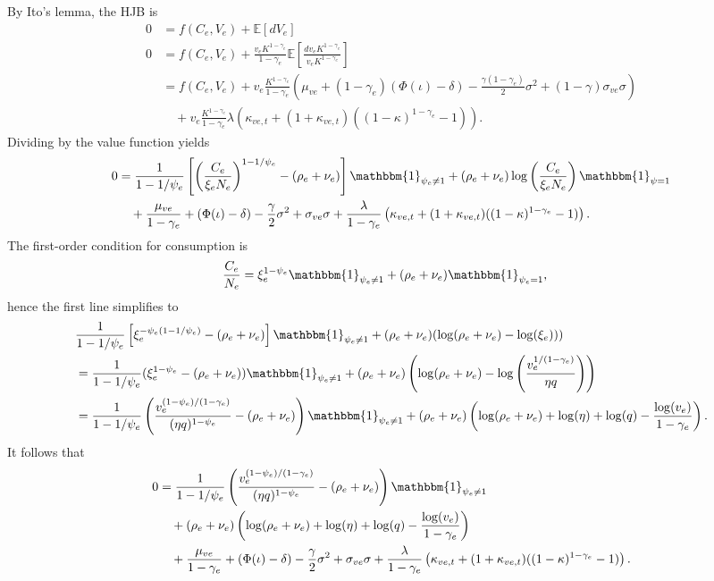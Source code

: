 \documentclass[12 pt, oneside]{article}
\theoremstyle{definition}
\theoremstyle{definition}
\theoremstyle{definition}
\newcommand{\E}{\mathbb{E}}
\begin{document}
By Ito's lemma, the HJB is
\begin{align*}
  0 & = f(C_e, V_e) + \E[dV_e] \\
  0 & = f(C_e, V_e) + \frac{v_eK^{1 - \gamma_e}}{1 - \gamma_e}\E\left[\frac{dv_eK^{1 - \gamma_e}}{v_eK^{1 - \gamma_e}}\right] \\
    & = f(C_e, V_e) + v_e\frac{K^{1 - \gamma_e}}{1 - \gamma_e}\left(\mu_{ve} + (1 - \gamma_e)(\Phi(\iota) - \delta) - \frac{\gamma(1 - \gamma_e)}{2}\sigma^2 + (1 - \gamma)\sigma_{ve} \sigma\right)\\
    &\quad +   v_e\frac{K^{1 - \gamma_e}}{1 - \gamma_e} \lambda\left(\kappa_{ve, t} + (1 + \kappa_{ve, t})((1 - \kappa)^{1 - \gamma_e} - 1) \right).
\end{align*}
Dividing by the value function yields
\begin{align*}
  0 & = \frac{1}{1 - 1 / \psi_e}\left[\left( \frac{C_e}{\xi_eN_e}\right)^{1 - 1 / \psi_e} - (\rho_e +\nu_e)\right]\mathbbm{1}_{\psi_e \neq 1} + (\rho_e + \nu_e)\log\left(\frac{C_e}{\xi_eN_e}\right)\mathbbm{1}_{\psi = 1}\\
&\quad + \frac{\mu_{ve}}{1 - \gamma_e} + (\Phi(\iota)  - \delta) - \frac{\gamma}{2}\sigma^2 + \sigma_{ve}\sigma +   \frac{\lambda}{1 - \gamma_e}\left(\kappa_{ve, t} + (1 + \kappa_{ve, t})((1 - \kappa)^{1 - \gamma_e} - 1) \right).
\end{align*}
The first-order condition for consumption is
\begin{align*}
  \frac{C_e}{N_e} & = \xi_e^{1 - \psi_e}\mathbbm{1}_{\psi_e \neq 1 } + (\rho_e + \nu_e)\mathbbm{1}_{\psi_e = 1},
\end{align*}
hence the first line simplifies to
\begin{align*}
&  \frac{1}{1 - 1/\psi_e}\left[\xi_e^{-\psi_e(1 - 1 / \psi_e)} -(\rho_e + \nu_e)   \right]\mathbbm{1}_{\psi_e \neq 1} + (\rho_e + \nu_e)(\log(\rho_e + \nu_e) - \log(\xi_e)))\\
& =\frac{1}{1 - 1/\psi_e}(\xi_e^{1-\psi_e} -(\rho_e + \nu_e))\mathbbm{1}_{\psi_e \neq 1} + (\rho_e + \nu_e)\left(\log(\rho_e + \nu_e) - \log\left(\frac{v_e^{1 / (1 - \gamma_e)}}{\eta q}\right)\right)\\
& =\frac{1}{1 - 1/\psi_e}\left(  \frac{v_e^{(1 - \psi_e) / (1 - \gamma_e)}}{(\eta q)^{1 - \psi_e}}  -(\rho_e + \nu_e)\right)\mathbbm{1}_{\psi_e \neq 1} + (\rho_e + \nu_e)\left(\log(\rho_e + \nu_e) + \log(\eta) + \log(q) - \frac{\log(v_e)}{1 - \gamma_e}\right).
\end{align*}
It follows that
\begin{align*}
0 & =\frac{1}{1 - 1/\psi_e}\left(  \frac{v_e^{(1 - \psi_e) / (1 - \gamma_e)}}{(\eta q)^{1 - \psi_e}}  -(\rho_e + \nu_e)\right)\mathbbm{1}_{\psi_e \neq 1}\\
&\quad  + (\rho_e + \nu_e)\left(\log(\rho_e + \nu_e) + \log(\eta) + \log(q) - \frac{\log(v_e)}{1 - \gamma_e}\right) \\
&\quad + \frac{\mu_{ve}}{1 - \gamma_e} + (\Phi(\iota)  - \delta) - \frac{\gamma}{2}\sigma^2 + \sigma_{ve}\sigma +   \frac{\lambda}{1 - \gamma_e}\left(\kappa_{ve, t} + (1 + \kappa_{ve, t})((1 - \kappa)^{1 - \gamma_e} - 1) \right).
\end{align*}
\end{document}
